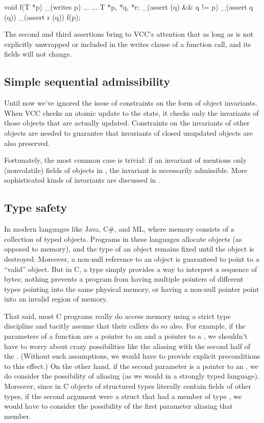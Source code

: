 \begin{VCC}
void f(T *p) 
  _(writes p) { ... }
...
T *p, *q, *r;
_(assert \wrapped(q) && q != p)
_(assert q \in \domain(q))
_(assert r \in \domain(q))
f(p);
\end{VCC}
\noindent
The second and third assertions bring to VCC's attention that as long
as  is not explicitly unwrapped or included in the writes
clause of a function call,  and its fields will not change.

\subsection{Simple sequential admissibility}
\label{sect:admissibility0}

Until now we've ignored the issue of constraints on the form of object
invariants. When VCC checks an atomic update to the state, it checks
only the invariants of those objects that are actually
updated. Constraints on the invariants of other objects are needed to
guarantee that invariants of closed unupdated objects are also preserved.

Fortunately, the most common case is trivial: if an invariant of
 mentions only (nonvolatile) fields of objects in
, the invariant is necessarily admissible.
More sophisticated kinds of invariants are discussed in .

\subsection{Type safety}
\label{sect:type-safety}

In modern languages like Java, C\#, and ML, where memory consists of a
collection of typed objects. Programs in these languages allocate
objects (as opposed to memory), and the type of an object remains
fixed until the object is destroyed. Moreover, a non-null reference to
an object is guaranteed to point to a ``valid'' object. But in C, a
type simply provides a way to interpret a sequence of bytes; nothing
prevents a program from having multiple pointers of different types
pointing into the same physical memory, or having a non-null
pointer point into an invalid region of memory.

That said, most C programs really do access memory using a strict type
discipline and tacitly assume that their callers do
so also. For example, if the parameters of a function are a pointer to
an  and a pointer to a , we shouldn't have to worry
about crazy possibilities like the  aliasing with the second
half of the . (Without such assumptions, we would have to
provide explicit preconditions to this effect.)  On the other hand, if
the second parameter is a pointer to an , we do consider the
possibility of aliasing (as we would in a strongly typed language).
Moreover, since in C objects of structured types literally contain
fields of other types, if the second argument were a struct that had
a member of type , we would have to consider the possibility
of the first parameter aliasing that member. 

